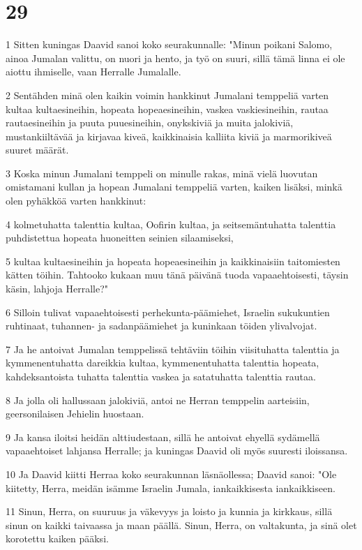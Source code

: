 \chapter{29}

\par 1 Sitten kuningas Daavid sanoi koko seurakunnalle: "Minun poikani Salomo, ainoa Jumalan valittu, on nuori ja hento, ja työ on suuri, sillä tämä linna ei ole aiottu ihmiselle, vaan Herralle Jumalalle.
\par 2 Sentähden minä olen kaikin voimin hankkinut Jumalani temppeliä varten kultaa kultaesineihin, hopeata hopeaesineihin, vaskea vaskiesineihin, rautaa rautaesineihin ja puuta puuesineihin, onykskiviä ja muita jalokiviä, mustankiiltävää ja kirjavaa kiveä, kaikkinaisia kalliita kiviä ja marmorikiveä suuret määrät.
\par 3 Koska minun Jumalani temppeli on minulle rakas, minä vielä luovutan omistamani kullan ja hopean Jumalani temppeliä varten, kaiken lisäksi, minkä olen pyhäkköä varten hankkinut:
\par 4 kolmetuhatta talenttia kultaa, Oofirin kultaa, ja seitsemäntuhatta talenttia puhdistettua hopeata huoneitten seinien silaamiseksi,
\par 5 kultaa kultaesineihin ja hopeata hopeaesineihin ja kaikkinaisiin taitomiesten kätten töihin. Tahtooko kukaan muu tänä päivänä tuoda vapaaehtoisesti, täysin käsin, lahjoja Herralle?"
\par 6 Silloin tulivat vapaaehtoisesti perhekunta-päämiehet, Israelin sukukuntien ruhtinaat, tuhannen- ja sadanpäämiehet ja kuninkaan töiden ylivalvojat.
\par 7 Ja he antoivat Jumalan temppelissä tehtäviin töihin viisituhatta talenttia ja kymmenentuhatta dareikkia kultaa, kymmenentuhatta talenttia hopeata, kahdeksantoista tuhatta talenttia vaskea ja satatuhatta talenttia rautaa.
\par 8 Ja jolla oli hallussaan jalokiviä, antoi ne Herran temppelin aarteisiin, geersonilaisen Jehielin huostaan.
\par 9 Ja kansa iloitsi heidän alttiudestaan, sillä he antoivat ehyellä sydämellä vapaaehtoiset lahjansa Herralle; ja kuningas Daavid oli myös suuresti iloissansa.
\par 10 Ja Daavid kiitti Herraa koko seurakunnan läsnäollessa; Daavid sanoi: "Ole kiitetty, Herra, meidän isämme Israelin Jumala, iankaikkisesta iankaikkiseen.
\par 11 Sinun, Herra, on suuruus ja väkevyys ja loisto ja kunnia ja kirkkaus, sillä sinun on kaikki taivaassa ja maan päällä. Sinun, Herra, on valtakunta, ja sinä olet korotettu kaiken pääksi.
